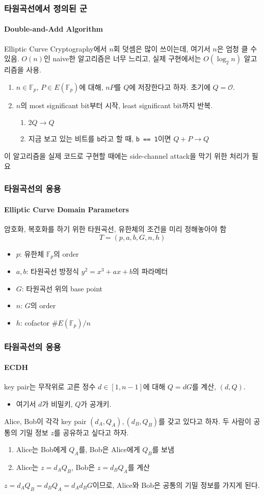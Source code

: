 \documentclass[aspectratio=169,mathserif]{beamer}
\newcommand{\Fp}{\mathbb{F}_p}
\begin{document}
  \begin{frame}
    \frametitle{타원곡선에서 정의된 군}
    \framesubtitle{Double-and-Add Algorithm}

    Elliptic Curve Cryptography에서 \(n\)회 덧셈은 많이 쓰이는데, 여기서 \(n\)은 엄청 클 수 있음.
    \pause
    \(O(n)\)인 naive한 알고리즘은 너무 느리고, 실제 구현에서는 \(O(\log_2 n)\) 알고리즘을 사용.
    \begin{enumerate}
      \item \(n\in\Fp,\,P\in E(\Fp)\)에 대해, \(nP\)를 \(Q\)에 저장한다고 하자. 초기에 \(Q = \mathcal{O}\).
      \item \(n\)의 most significant bit부터 시작, least significant bit까지 반복.
      \pause
      \begin{enumerate}
        \item \(2Q\to Q\)
        \item 지금 보고 있는 비트를 \texttt{b}라고 할 때, \texttt{b == 1}이면 \(Q + P\to Q\)
      \end{enumerate}
    \end{enumerate}
    \pause
    이 알고리즘을 실제 코드로 구현할 때에는 side-channel attack을 막기 위한 처리가 필요
  \end{frame}

  \begin{frame}
    \frametitle{타원곡선의 응용}
    \framesubtitle{Elliptic Curve Domain Parameters}

    암호화, 복호화를 하기 위한 타원곡선, 유한체의 조건을 미리 정해놓아야 함
    \[T=(p,a,b,G,n,h)\]
    \begin{itemize}
      \item \(p\): 유한체 \(\Fp\)의 order
      \item \(a, b\): 타원곡선 방정식 \(y^2 = x^3 + ax + b\)의 파라메터
      \item \(G\): 타원곡선 위의 base point
      \item \(n\): \(G\)의 order
      \item \(h\): cofactor \(\#E(\Fp)/n\)
    \end{itemize}
  \end{frame}

  \begin{frame}
    \frametitle{타원곡선의 응용}
    \framesubtitle{ECDH}

    key pair는 무작위로 고른 정수 \(d\in [1,n-1]\)에 대해 \(Q=dG\)를 계산, \((d,Q)\).
    \begin{itemize}
      \item 여기서 \(d\)가 비밀키, \(Q\)가 공개키.
    \end{itemize}
    \pause
    Alice, Bob이 각각 key pair \((d_A,Q_A), (d_B,Q_B)\)를 갖고 있다고 하자. 두 사람이 공통의 기밀 정보 \(z\)를 공유하고 싶다고 하자.
    \begin{enumerate}
      \item Alice는 Bob에게 \(Q_A\)를, Bob은 Alice에게 \(Q_B\)를 보냄
      \item Alice는 \(z = d_A Q_B\), Bob은 \(z = d_B Q_A\)를 계산
    \end{enumerate}
    \pause
    \(z = d_A Q_B = d_B Q_A = d_A d_B G\)이므로, Alice와 Bob은 공통의 기밀 정보를 가지게 된다.
  \end{frame}
\end{document}
